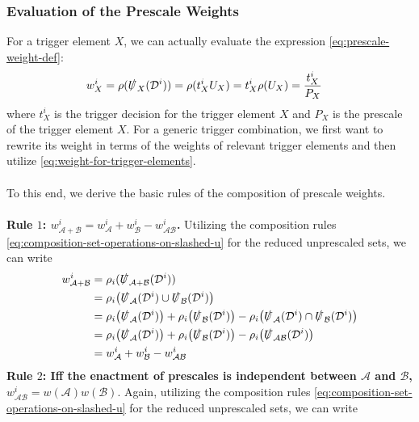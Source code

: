 \subsubsection{Evaluation of the Prescale Weights}
\label{subsubsec:app-prw-evaluation-of-prescale-weights}
For a trigger element $X$, we can actually evaluate the expression \eqref{eq:prescale-weight-def}:
\begin{align}
\label{eq:weight-for-trigger-elements}
    w_X^i&=\rho(\slashed{U}_X(\mathcal{D}^i))=\rho(t_X^iU_X)=t^i_X\rho(U_X)=\frac{t^i_X}{P_X}
\end{align}
where $t^i_X$ is the trigger decision for the trigger element $X$ and $P_X$ is the prescale of the trigger element $X$. For a generic trigger combination, we first want to rewrite its weight in terms of the weights of relevant trigger elements and then utilize \eqref{eq:weight-for-trigger-elements}. 
\\\\
To this end, we derive the basic rules of the composition of prescale weights. %
\\\\
\textbf{Rule $1$: $w^i_{\mathcal{A}+\mathcal{B}}=w^i_{\mathcal{A}}+w^i_{\mathcal{B}}-w^i_{\mathcal{AB}}$.} Utilizing the composition rules \eqref{eq:composition-set-operations-on-slashed-u} for the reduced unprescaled sets, we can write 
\begin{subequations}
\label{eq:sum-general}
\begin{align}
    w^i_{\mathcal{A}+\mathcal{B}}&=\rho_i(\slashed{U}_{\mathcal{A}+\mathcal{B}}(\mathcal{D}^i))\\
    &=\rho_i\big(\slashed{U}_{\mathcal{A}}(\mathcal{D}^i)\cup \slashed{U}_{\mathcal{B}}(\mathcal{D}^i)\big)\\
    &=\rho_i\big(\slashed{U}_{\mathcal{A}}(\mathcal{D}^i)\big)+\rho_i\big(\slashed{U}_{\mathcal{B}}(\mathcal{D}^i)\big)-\rho_i\big(\slashed{U}_{\mathcal{A}}(\mathcal{D}^i)\cap \slashed{U}_{\mathcal{B}}(\mathcal{D}^i)\big)\\
    &=\rho_i\big(\slashed{U}_{\mathcal{A}}(\mathcal{D}^i)\big)+\rho_i\big(\slashed{U}_{\mathcal{B}}(\mathcal{D}^i)\big)-\rho_i\big(\slashed{U}_{\mathcal{A}\mathcal{B}}(\mathcal{D}^i)\big)\\
    &=w^i_{\mathcal{A}}+w^i_{\mathcal{B}}-w^i_{\mathcal{AB}}
\end{align}
\end{subequations}
\textbf{Rule $2$: Iff the enactment of prescales is independent between $\mathcal{A}$ and $\mathcal{B}$, $w^i_{\mathcal{A}\mathcal{B}}=w(\mathcal{A})w(\mathcal{B})$}. Again, utilizing the composition rules \eqref{eq:composition-set-operations-on-slashed-u} for the reduced unprescaled sets, we can write
